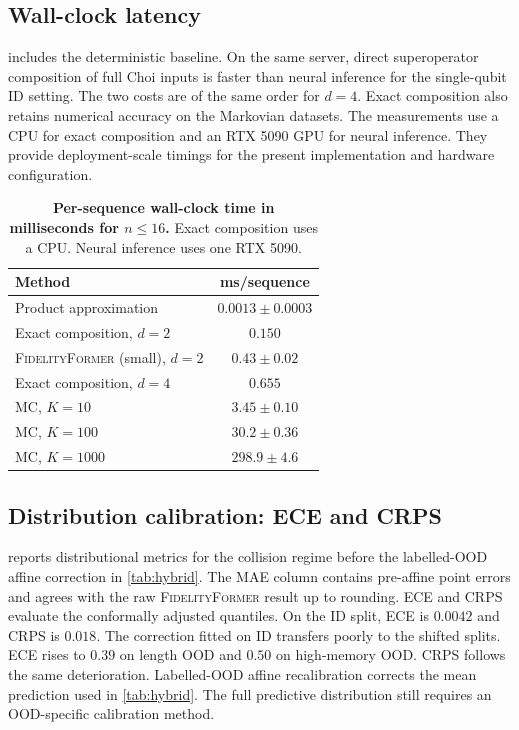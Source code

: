 \documentclass[12pt]{iopart}
\newcommand{\fidno}{\textsc{FidelityFormer}}
\begin{document}
\subsection{Wall-clock latency}
\label{sec:exp_latency}

 includes the deterministic baseline. On the same server, direct superoperator composition of full Choi inputs is faster than neural inference for the single-qubit ID setting. The two costs are of the same order for $d=4$. Exact composition also retains numerical accuracy on the Markovian datasets. The measurements use a CPU for exact composition and an RTX 5090 GPU for neural inference. They provide deployment-scale timings for the present implementation and hardware configuration.

\begin{table}[h]
\centering
\caption{\textbf{Per-sequence wall-clock time in milliseconds for $n\leq16$.} Exact composition uses a CPU. Neural inference uses one RTX 5090.}
\label{tab:latency}
\begin{tabular}{lc}
\toprule
Method & ms/sequence \\
\midrule
Product approximation & $0.0013\pm0.0003$ \\
Exact composition, $d=2$ & $0.150$ \\
\fidno{} (small), $d=2$ & $0.43\pm0.02$ \\
Exact composition, $d=4$ & $0.655$ \\
MC, $K{=}10$ & $3.45\pm0.10$ \\
MC, $K{=}100$ & $30.2\pm0.36$ \\
MC, $K{=}1000$ & $298.9\pm4.6$ \\
\bottomrule
\end{tabular}
\end{table}

\subsection{Distribution calibration: ECE and CRPS}
\label{sec:exp_calibration}

 reports distributional metrics for the collision regime before the labelled-OOD affine correction in \cref{tab:hybrid}. The MAE column contains pre-affine point errors and agrees with the raw \fidno{} result up to rounding. ECE and CRPS evaluate the conformally adjusted quantiles. On the ID split, ECE is $0.0042$ and CRPS is $0.018$. The correction fitted on ID transfers poorly to the shifted splits. ECE rises to $0.39$ on length OOD and $0.50$ on high-memory OOD. CRPS follows the same deterioration. Labelled-OOD affine recalibration corrects the mean prediction used in \cref{tab:hybrid}. The full predictive distribution still requires an OOD-specific calibration method.
\end{document}
